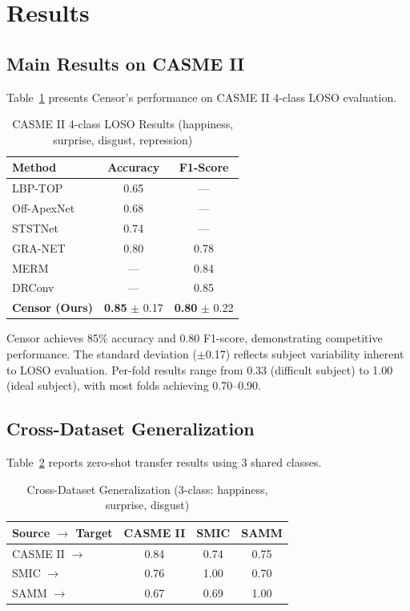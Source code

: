 
\section{Results}
\label{sec:results}

\subsection{Main Results on CASME II}

Table~\ref{tab:main_results} presents Censor's performance on CASME II 4-class LOSO evaluation.

\begin{table}[htbp]
\centering
\caption{CASME II 4-class LOSO Results (happiness, surprise, disgust, repression)}
\label{tab:main_results}
\begin{tabular}{lcc}
\toprule
Method & Accuracy & F1-Score \\
\midrule
LBP-TOP~\cite{zhao2007lbptop} & 0.65 & --- \\
Off-ApexNet~\cite{wang2015offapexnet} & 0.68 & --- \\
STSTNet~\cite{ststnet2021} & 0.74 & --- \\
GRA-NET~\cite{graNet2021} & 0.80 & 0.78 \\
MERM~\cite{merm2023} & --- & 0.84 \\
DRConv~\cite{drconv2024} & --- & 0.85 \\
\textbf{Censor (Ours)} & \textbf{0.85} $\pm$ 0.17 & \textbf{0.80} $\pm$ 0.22 \\
\bottomrule
\end{tabular}
\end{table}

Censor achieves 85\% accuracy and 0.80 F1-score, demonstrating competitive performance. The standard deviation ($\pm$0.17) reflects subject variability inherent to LOSO evaluation. Per-fold results range from 0.33 (difficult subject) to 1.00 (ideal subject), with most folds achieving 0.70--0.90.

\subsection{Cross-Dataset Generalization}

Table~\ref{tab:cross_dataset} reports zero-shot transfer results using 3 shared classes.

\begin{table}[htbp]
\centering
\caption{Cross-Dataset Generalization (3-class: happiness, surprise, disgust)}
\label{tab:cross_dataset}
\begin{tabular}{lccc}
\toprule
Source $\rightarrow$ Target & CASME II & SMIC & SAMM \\
\midrule
CASME II $\rightarrow$ & 0.84 & 0.74 & 0.75 \\
SMIC $\rightarrow$ & 0.76 & 1.00 & 0.70 \\
SAMM $\rightarrow$ & 0.67 & 0.69 & 1.00 \\
\bottomrule
\end{tabular}
\end{table}

